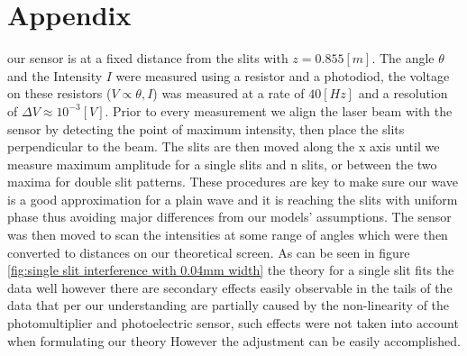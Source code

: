 \section{Appendix}
our sensor is at a fixed distance from the slits with $z=0.855 [m]$.
The angle $\theta$ and the Intensity $I$ were measured using a resistor and a photodiod, the voltage on these resistors ($V\propto\theta,I$) was
measured at a rate of $40[Hz]$ and a resolution of $\Delta V\approx10^{-3}[V]$.
Prior to every measurement we align the laser beam with the sensor by detecting the point of maximum intensity, then place the slits perpendicular to
the beam.
The slits are then moved along the x axis until we measure maximum amplitude for a single slits and n slits, or between the two maxima for double slit patterns.
These procedures are key to make sure our wave is a good approximation for a plain wave and it is reaching the slits with uniform phase thus avoiding major differences from our models' assumptions.
The sensor was then moved to scan the intensities at some range of angles which were then converted to distances on our theoretical screen.
As can be seen in figure \ref{fig:single slit interference with 0.04mm width} the theory for a single slit fits the data well however there are
secondary effects easily observable in the tails of the data that per our understanding are partially caused by the non-linearity of the
photomultiplier and photoelectric sensor, such effects were not taken into account when formulating our theory
However the adjustment can be easily accomplished.


